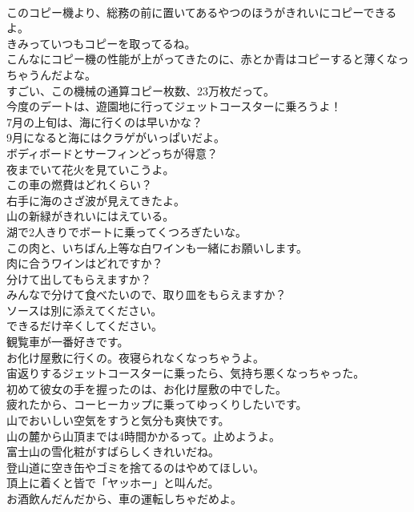 \documentclass[8pt]{extreport}
\begin{document}
\begin{CJK}{UTF8}{min}
\\	このコピー機より、総務の前に置いてあるやつのほうがきれいにコピーできるよ。	
\\	きみっていつもコピーを取ってるね。	
\\	こんなにコピー機の性能が上がってきたのに、赤とか青はコピーすると薄くなっちゃうんだよな。	
\\	すごい、この機械の通算コピー枚数、23万枚だって。	
\\	今度のデートは、遊園地に行ってジェットコースターに乗ろうよ！	
\\	7月の上旬は、海に行くのは早いかな？	
\\	9月になると海にはクラゲがいっぱいだよ。	
\\	ボディボードとサーフィンどっちが得意？	
\\	夜までいて花火を見ていこうよ。	
\\	この車の燃費はどれくらい？	
\\	右手に海のさざ波が見えてきたよ。	
\\	山の新緑がきれいにはえている。	
\\	湖で2人きりでボートに乗ってくつろぎたいな。	
\\	この肉と、いちばん上等な白ワインも一緒にお願いします。	
\\	肉に合うワインはどれですか？	
\\	分けて出してもらえますか？	
\\	みんなで分けて食べたいので、取り皿をもらえますか？	
\\	ソースは別に添えてください。	
\\	できるだけ辛くしてください。	
\\	観覧車が一番好きです。	
\\	お化け屋敷に行くの。夜寝られなくなっちゃうよ。	
\\	宙返りするジェットコースターに乗ったら、気持ち悪くなっちゃった。	
\\	初めて彼女の手を握ったのは、お化け屋敷の中でした。	
\\	疲れたから、コーヒーカップに乗ってゆっくりしたいです。	
\\	山でおいしい空気をすうと気分も爽快です。	
\\	山の麓から山頂までは4時間かかるって。止めようよ。	
\\	富士山の雪化粧がすばらしくきれいだね。	
\\	登山道に空き缶やゴミを捨てるのはやめてほしい。	
\\	頂上に着くと皆で「ヤッホー」と叫んだ。	
\\	お酒飲んだんだから、車の運転しちゃだめよ。	

\end{CJK}
\end{document}
